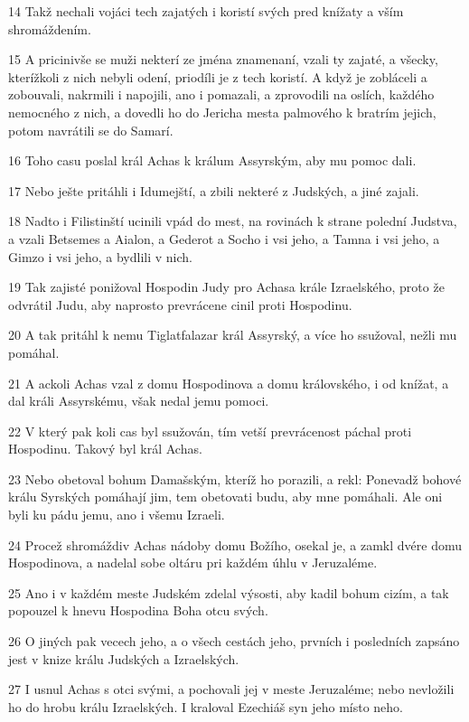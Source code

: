\par 14 Takž nechali vojáci tech zajatých i koristí svých pred knížaty a vším shromáždením.
\par 15 A pricinivše se muži nekterí ze jména znamenaní, vzali ty zajaté, a všecky, kterížkoli z nich nebyli odení, priodíli je z tech koristí. A když je zobláceli a zobouvali, nakrmili i napojili, ano i pomazali, a zprovodili na oslích, každého nemocného z nich, a dovedli ho do Jericha mesta palmového k bratrím jejich, potom navrátili se do Samarí.
\par 16 Toho casu poslal král Achas k králum Assyrským, aby mu pomoc dali.
\par 17 Nebo ješte pritáhli i Idumejští, a zbili nekteré z Judských, a jiné zajali.
\par 18 Nadto i Filistinští ucinili vpád do mest, na rovinách k strane polední Judstva, a vzali Betsemes a Aialon, a Gederot a Socho i vsi jeho, a Tamna i vsi jeho, a Gimzo i vsi jeho, a bydlili v nich.
\par 19 Tak zajisté ponižoval Hospodin Judy pro Achasa krále Izraelského, proto že odvrátil Judu, aby naprosto prevrácene cinil proti Hospodinu.
\par 20 A tak pritáhl k nemu Tiglatfalazar král Assyrský, a více ho ssužoval, nežli mu pomáhal.
\par 21 A ackoli Achas vzal z domu Hospodinova a domu královského, i od knížat, a dal králi Assyrskému, však nedal jemu pomoci.
\par 22 V který pak koli cas byl ssužován, tím vetší prevrácenost páchal proti Hospodinu. Takový byl král Achas.
\par 23 Nebo obetoval bohum Damašským, kteríž ho porazili, a rekl: Ponevadž bohové králu Syrských pomáhají jim, tem obetovati budu, aby mne pomáhali. Ale oni byli ku pádu jemu, ano i všemu Izraeli.
\par 24 Procež shromáždiv Achas nádoby domu Božího, osekal je, a zamkl dvére domu Hospodinova, a nadelal sobe oltáru pri každém úhlu v Jeruzaléme.
\par 25 Ano i v každém meste Judském zdelal výsosti, aby kadil bohum cizím, a tak popouzel k hnevu Hospodina Boha otcu svých.
\par 26 O jiných pak vecech jeho, a o všech cestách jeho, prvních i posledních zapsáno jest v knize králu Judských a Izraelských.
\par 27 I usnul Achas s otci svými, a pochovali jej v meste Jeruzaléme; nebo nevložili ho do hrobu králu Izraelských. I kraloval Ezechiáš syn jeho místo neho.

